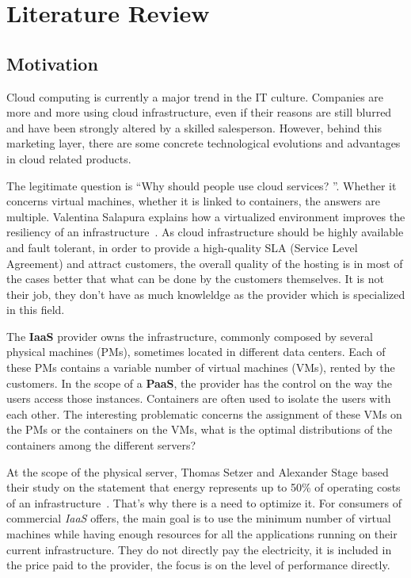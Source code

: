 \chapter{Literature Review}
\label{litreview}

\section{Motivation}

Cloud computing is currently a major trend in the IT culture. Companies
are more and more using cloud infrastructure, even if their reasons are still
blurred and have been strongly altered by a skilled salesperson. However, behind
this marketing layer, there are some concrete technological evolutions and
advantages in cloud related products.

The legitimate question is “Why should people use cloud services? ”. Whether
it concerns virtual machines, whether it is linked to containers, the answers
are multiple. Valentina Salapura explains how a virtualized environment
improves the resiliency of an infrastructure~\cite{virtresiliency}.
As cloud infrastructure should be highly available and fault tolerant, in order
to provide a high-quality SLA (Service Level Agreement) and attract customers,
the overall quality of the hosting is in most of the cases better that what can
be done by the customers themselves. It is not their job, they don't have as
much knowleldge as the provider which is specialized in this field.

The \textbf{IaaS} provider owns the infrastructure, commonly composed by
several physical machines (PMs), sometimes located in different data centers.
Each of these PMs contains a variable number of virtual machines (VMs), rented
by the customers. In the scope of a \textbf{PaaS}, the provider has the control
on the way the users access those instances. Containers are often used to
isolate the users with each other. The interesting problematic concerns the
assignment of these VMs on the PMs or the containers on the VMs, what is the
optimal distributions of the containers among the different servers?

At the scope of the physical server, Thomas Setzer and Alexander Stage based
their study on the statement that energy represents up to 50\% of operating
costs of an infrastructure~\cite{reassignmentElectricitysaving}. That's why
there is a need to optimize it. For consumers of commercial \textit{IaaS}
offers, the main goal is to use the minimum number of virtual machines while
having enough resources for all the applications running on their current
infrastructure. They do not directly pay the electricity, it is included in the
price paid to the provider, the focus is on the level of performance directly.

